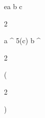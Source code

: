 \begin{eqcode}{e}{a }{}{}
  b \in {} \lend
  c \gets
  \begin{tmatrix}
  2  \lend
  \end{tmatrix} \lend
  a \gets \genar \limits ^ {5}(c) \lend
  b \gets \genar \limits ^ {  \begin{tmatrix}
  2  \lend
  \end{tmatrix} }( \begin{tmatrix}
  2  \lend
  \end{tmatrix})  \lend
   \lend
\end{eqcode}
